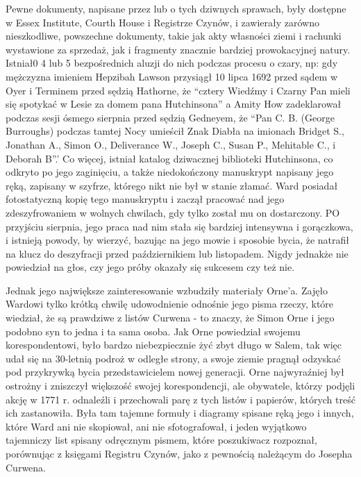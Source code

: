Pewne dokumenty, napisane przez lub o tych dziwnych sprawach, były dostępne w Essex Institute, Courth House i Registrze Czynów, i zawierały zarówno nieszkodliwe, powszechne dokumenty, takie jak akty własności ziemi i rachunki wystawione za sprzedaż, jak i fragmenty znacznie bardziej prowokacyjnej natury. Istniał0 4 lub 5 bezpośrednich aluzji do nich podczas procesu o czary, np: gdy mężczyzna imieniem Hepzibah Lawson przysiągł 10 lipca 1692 przed sądem w Oyer i Terminem przed sędzią Hathorne, że ``cztery Wiedźmy i Czarny Pan mieli się spotykać w Lesie za domem pana Hutchinsona'' a Amity How zadeklarował podczas sesji ósmego sierpnia przed sędzią Gedneyem, że ``Pan C. B. (George Burroughs) podczas tamtej Nocy umieścił Znak Diabła na imionach Bridget S., Jonathan A., Simon O., Deliverance W., Joseph C., Susan P., Mehitable C., i Deborah B''.' Co więcej, istniał katalog dziwacznej biblioteki Hutchinsona, co odkryto po jego zaginięciu, a także niedokończony manuskrypt napisany jego ręką, zapisany w szyfrze, którego nikt nie był w stanie złamać. Ward posiadał fotostatyczną kopię tego manuskryptu i zaczął pracować nad jego zdeszyfrowaniem w wolnych chwilach, gdy tylko został mu on dostarczony. PO przyjściu sierpnia, jego praca nad nim stała się bardziej intensywna i gorączkowa, i istnieją powody, by wierzyć, bazując na jego mowie i sposobie bycia, że natrafił na klucz do deszyfracji przed październikiem lub listopadem. Nigdy jednakże nie powiedział na głos, czy jego próby okazały się sukcesem czy też nie. 

Jednak jego największe zainteresowanie wzbudziły materiały Orne'a. Zajęło Wardowi tylko krótką chwilę udowodnienie odnośnie jego pisma rzeczy, które wiedział, że są prawdziwe z listów Curwena - to znaczy, że Simon Orne i jego podobno syn to jedna i ta sama osoba. Jak Orne powiedział swojemu korespondentowi, było bardzo niebezpiecznie żyć zbyt długo w Salem, tak więc udał się na 30-letnią podroż w odległe strony, a swoje ziemie pragnął odzyskać pod przykrywką bycia przedstawicielem nowej generacji. Orne najwyraźniej był ostrożny i zniszczył większość swojej korespondencji, ale obywatele, którzy podjęli akcję w 1771 r. odnaleźli i przechowali parę z tych listów i papierów, których treść ich zastanowiła. Była tam tajemne formuły i diagramy spisane ręką jego i innych, które Ward ani nie skopiował, ani nie sfotografował, i jeden wyjątkowo tajemniczy list spisany odręcznym pismem, które poszukiwacz rozpoznał, porównując z księgami Registru Czynów, jako z pewnością należącym do Josepha Curwena. 

